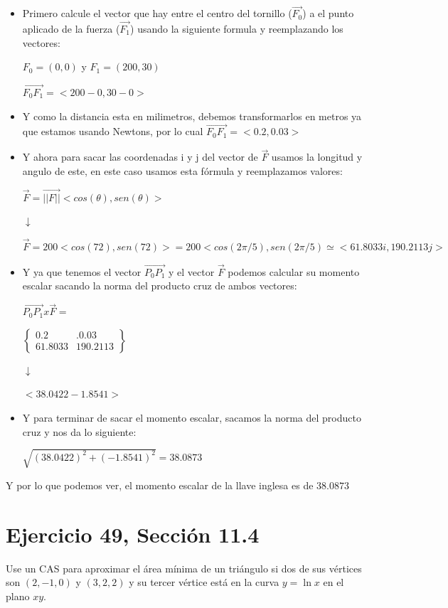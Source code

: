 \documentclass[11pt,letterpaper]{article}
\begin{document}
\begin{itemize}
    
    \item Primero calcule el vector que hay entre el centro del tornillo ($\vec{F_0}$) a el punto aplicado de la fuerza ($\vec{F_1}$) usando la siguiente formula y reemplazando los vectores:
    \begin{center}
        $F_0 = (0,0)$ y $F_1 = (200, 30)$
        
        $\vec{F_0 F_1} = <200 - 0, 30 - 0>$
    \end{center}
    \item Y como la distancia esta en milimetros, debemos transformarlos en metros ya que estamos usando Newtons, por lo cual $\vec{F_0 F_1} = <0.2, 0.03>$
    \item Y ahora para sacar las coordenadas i y j del vector de $\vec{F}$ usamos la longitud y angulo de este, en este caso usamos esta fórmula y reemplazamos valores:
    \begin{center}
        $\vec{F} = \vec{||F||}<cos(\theta), sen(\theta)>$
        
        $\downarrow$
    
        $\vec{F} = 200<cos(72), sen(72)> = 200<cos(2\pi/5), sen(2\pi/5) \simeq <61.8033 i, 190.2113 j>$ 
        
    \end{center}
    \item Y ya que tenemos el vector $\vec{P_0 P_1}$ y el vector $\vec{F}$ podemos calcular su momento escalar sacando la norma del producto cruz de ambos vectores:
    \begin{center}
        $\vec{P_0 P_1} x \vec{F} = $
        
        $\begin{Bmatrix}
            0.2 & .0.03\\
            61.8033 & 190.2113
        \end{Bmatrix}$
        
    
        $\downarrow$
    
        $<38.0422 - 1.8541> $    
    \end{center}
    \item Y para terminar de sacar el momento escalar, sacamos la norma del producto cruz y nos da lo siguiente:
    \begin{center}
        $\sqrt{(38.0422)^{2} + (-1.8541)^{2}} = 38.0873 $
    \end{center}
\end{itemize}

Y por lo que podemos ver, el momento escalar de la llave inglesa es de $38.0873$ 

\section{Ejercicio 49, Sección 11.4}
Use un CAS para aproximar el área mínima de un triángulo si dos de sus vértices son $(2, -1, 0)$ y $(3, 2, 2)$ y su tercer vértice está en la curva $y = \ln x$ en el plano $xy$.
\end{document}
